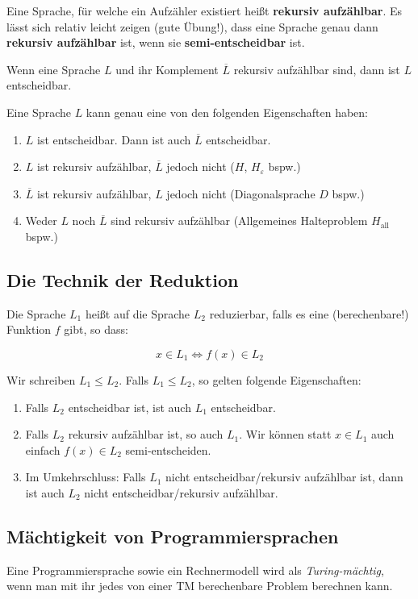 \documentclass[a4paper,parskip=half*,DIV=7,fontsize=11pt]{scrartcl}
\newcommand\comp[1]{\overline#1}
\begin{document}
Eine Sprache, für welche ein Aufzähler existiert heißt \textbf{rekursiv aufzählbar}. Es lässt sich relativ leicht zeigen (gute Übung!), dass eine Sprache genau dann \textbf{rekursiv aufzählbar} ist, wenn sie \textbf{semi-entscheidbar} ist.

Wenn eine Sprache $L$ und ihr Komplement $\comp{L}$ rekursiv aufzählbar sind, dann ist $L$ entscheidbar.

Eine Sprache $L$ kann genau eine von den folgenden  Eigenschaften haben:

\begin{enumerate}
\item  $L$ ist entscheidbar. Dann ist auch $\comp{L}$ entscheidbar.
\item $L$ ist rekursiv aufzählbar, $\comp{L}$ jedoch nicht ($H$, $H_\varepsilon$ bspw.)
\item $\comp{L}$ ist rekursiv aufzählbar, $L$ jedoch nicht (Diagonalsprache $D$ bspw.)
\item Weder $L$ noch $\comp{L}$ sind rekursiv aufzählbar (Allgemeines Halteproblem $H_\text{all}$ bspw.)
\end{enumerate}

\subsection{Die Technik der Reduktion}
\label{sec:reduktion}
Die Sprache $L_1$ heißt auf die Sprache $L_2$ reduzierbar, falls  es eine (berechenbare!) Funktion $f$ gibt, so dass:

\[x \in L_1 \iff f(x) \in L_2\]

Wir schreiben $L_1 \leq L_2$. Falls $L_1 \leq L_2$, so gelten folgende Eigenschaften:

\begin{enumerate}
\item Falls $L_2$ entscheidbar ist, ist auch $L_1$ entscheidbar.
\item  Falls $L_2$ rekursiv aufzählbar ist, so auch $L_1$. Wir können statt $x \in L_1$ auch einfach $f(x) \in L_2$ semi-entscheiden.
\item Im Umkehrschluss: Falls $L_1$ nicht entscheidbar/rekursiv aufzählbar ist, dann ist auch $L_2$ nicht entscheidbar/rekursiv aufzählbar.
\end{enumerate}

\subsection{Mächtigkeit von Programmiersprachen}
Eine Programmiersprache sowie ein Rechnermodell wird als \emph{Turing-mächtig}, wenn man mit ihr  jedes von einer TM berechenbare Problem berechnen kann.
\end{document}
